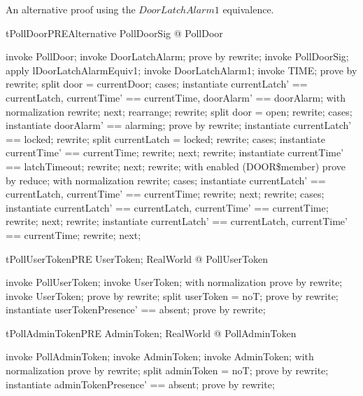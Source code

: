 An alternative proof using the $DoorLatchAlarm1$ equivalence.
\begin{theorem}{tPollDoorPREAlternative}
\forall  PollDoorSig @ \pre  PollDoor
\end{theorem}

\begin{zproof}[tPollDoorPREAlternative]
invoke PollDoor;
invoke \Delta DoorLatchAlarm;
prove by rewrite;
invoke PollDoorSig;
apply lDoorLatchAlarmEquiv1;
invoke DoorLatchAlarm1;
invoke TIME;
prove by rewrite;
split door = currentDoor;
cases;
instantiate
  currentLatch' == currentLatch, currentTime' == currentTime,
  doorAlarm' == doorAlarm;
with normalization rewrite;
next;
rearrange;
rewrite;
split door = open;
rewrite;
cases;
instantiate doorAlarm' == alarming;
prove by rewrite;
instantiate currentLatch' == locked;
rewrite;
split currentLatch = locked;
rewrite;
cases;
instantiate currentTime' == currentTime;
rewrite;
next;
rewrite;
instantiate currentTime' == latchTimeout;
rewrite;
next;
rewrite;
with enabled (DOOR\$member) prove by reduce;
with normalization rewrite;
cases;
instantiate currentLatch' == currentLatch, currentTime' == currentTime;
rewrite;
next;
rewrite;
cases;
instantiate currentLatch' == currentLatch, currentTime' == currentTime;
rewrite;
next;
rewrite;
instantiate currentLatch' == currentLatch, currentTime' == currentTime;
rewrite;
next;
\end{zproof}

\begin{theorem}{tPollUserTokenPRE}
   \forall UserToken; RealWorld @ \pre PollUserToken
\end{theorem}

\begin{zproof}[tPollUserTokenPRE]
invoke PollUserToken;
invoke \Delta UserToken;
with normalization prove by rewrite;
invoke UserToken;
prove by rewrite;
split userToken = noT;
prove by rewrite;
instantiate userTokenPresence' == absent;
prove by rewrite;
\end{zproof}

\begin{theorem}{tPollAdminTokenPRE}
   \forall AdminToken; RealWorld @ \pre PollAdminToken
\end{theorem}

\begin{zproof}[tPollAdminTokenPRE]
invoke PollAdminToken;
invoke \Delta AdminToken;
invoke AdminToken;
with normalization prove by rewrite;
split adminToken = noT;
prove by rewrite;
instantiate adminTokenPresence' == absent;
prove by rewrite;
\end{zproof}

